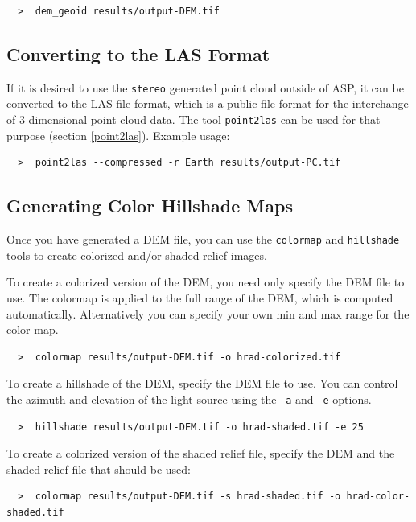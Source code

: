 \begin {verbatim}
  >  dem_geoid results/output-DEM.tif
\end{verbatim}

\subsection{Converting to the LAS Format}

If it is desired to use the \texttt{stereo} generated point cloud
outside of ASP, it can be converted to the LAS file format, which is a public file
format for the interchange of 3-dimensional point cloud data. The tool
\texttt{point2las} can be used for that purpose (section
\ref{point2las}). Example usage:

\begin {verbatim}
  >  point2las --compressed -r Earth results/output-PC.tif
\end{verbatim}

\subsection{Generating Color Hillshade Maps}

Once you have generated a \ac{DEM} file, you can use the
\texttt{colormap} and \texttt{hillshade} tools to create colorized
and/or shaded relief images.

To create a colorized version of the \ac{DEM}, you need only specify
the \ac{DEM} file to use. The colormap is applied to the full range of
the DEM, which is computed automatically.  Alternatively you can
specify your own min and max range for the color map.

\begin{verbatim}
  >  colormap results/output-DEM.tif -o hrad-colorized.tif
\end{verbatim}

To create a hillshade of the \ac{DEM}, specify the \ac{DEM} file to
use. You can control the azimuth and elevation of the light source
using the \texttt{-a} and \texttt{-e} options.

\begin{verbatim}
  >  hillshade results/output-DEM.tif -o hrad-shaded.tif -e 25
\end{verbatim}

To create a colorized version of the shaded relief file, specify
the \ac{DEM} and the shaded relief file that should be used:

\begin{verbatim}
  >  colormap results/output-DEM.tif -s hrad-shaded.tif -o hrad-color-shaded.tif
\end{verbatim}

